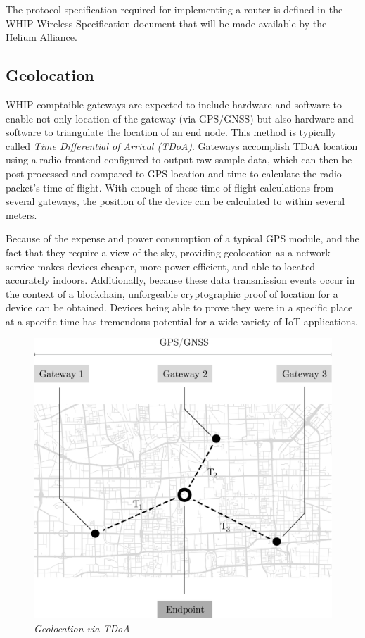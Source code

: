\documentclass[letterpaper,11pt]{article}
\begin{document}
The protocol specification required for implementing a router is defined in the WHIP Wireless Specification document that will be made available by the Helium Alliance\cite{alliance}.

\subsection{Geolocation}\label{geolocation}

WHIP-comptaible gateways are expected to include hardware and software to enable not only location of the gateway (via GPS/GNSS) but also hardware and software to triangulate the location of an end node. This method is typically called \emph{Time Differential of Arrival (TDoA)}. Gateways accomplish TDoA location using a radio frontend configured to output raw sample data, which can then be post processed and compared to GPS location and time to calculate the radio packet's time of flight. With enough of these time-of-flight calculations from several gateways, the position of the device can be calculated to within several meters.\newline

Because of the expense and power consumption of a typical GPS module, and the fact that they require a view of the sky, providing geolocation as a network service makes devices cheaper, more power efficient, and able to located accurately indoors. Additionally, because these data transmission events occur in the context of a blockchain, unforgeable cryptographic proof of location for a device can be obtained. Devices being able to prove they were in a specific place at a specific time has tremendous potential for a wide variety of IoT applications.\newline

\begin{figure}[H]
	\begin{center}
  		\includegraphics[scale=0.3]{tdoa.eps}
  		\caption{\emph{Geolocation via TDoA}}
  		\label{fig:tdoa}
 	\end{center}
\end{figure}
\end{document}
